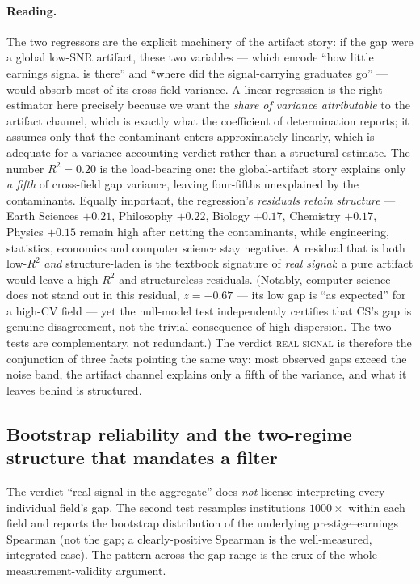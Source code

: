 \documentclass[11pt]{article}
\begin{document}
\paragraph{Reading.}
The two regressors are the explicit machinery of the artifact story: if the gap were a global low-SNR artifact, these two variables --- which encode ``how little earnings signal is there'' and ``where did the signal-carrying graduates go'' --- would absorb most of its cross-field variance. A linear regression is the right estimator here precisely because we want the \emph{share of variance attributable} to the artifact channel, which is exactly what the coefficient of determination reports; it assumes only that the contaminant enters approximately linearly, which is adequate for a variance-accounting verdict rather than a structural estimate. The number $R^2=0.20$ is the load-bearing one: the global-artifact story explains only \emph{a fifth} of cross-field gap variance, leaving four-fifths unexplained by the contaminants. Equally important, the regression's \emph{residuals retain structure} --- Earth Sciences $+0.21$, Philosophy $+0.22$, Biology $+0.17$, Chemistry $+0.17$, Physics $+0.15$ remain high after netting the contaminants, while engineering, statistics, economics and computer science stay negative. A residual that is both low-$R^2$ \emph{and} structure-laden is the textbook signature of \emph{real signal}: a pure artifact would leave a high $R^2$ and structureless residuals. (Notably, computer science does not stand out in this residual, $z=-0.67$ --- its low gap is ``as expected'' for a high-CV field --- yet the null-model test independently certifies that CS's gap is genuine disagreement, not the trivial consequence of high dispersion. The two tests are complementary, not redundant.) The verdict \textsc{real signal} is therefore the conjunction of three facts pointing the same way: most observed gaps exceed the noise band, the artifact channel explains only a fifth of the variance, and what it leaves behind is structured.

\subsection{Bootstrap reliability and the two-regime structure that mandates a filter}

The verdict ``real signal in the aggregate'' does \emph{not} license interpreting every individual field's gap. The second test resamples institutions $1000\times$ within each field and reports the bootstrap distribution of the underlying prestige--earnings Spearman (not the gap; a clearly-positive Spearman is the well-measured, integrated case). The pattern across the gap range is the crux of the whole measurement-validity argument.
\end{document}
